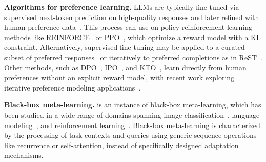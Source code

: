 \noindent \textbf{Algorithms for preference learning.}
LLMs are typically fine-tuned via supervised next-token prediction on high-quality responses and later refined with human preference data~\citep{casper2023open,ouyang2022training}. This process can use on-policy reinforcement learning methods like REINFORCE~\citep{NIPS1999_464d828b} or PPO~\citep{2017arXiv170706347S}, which optimize a reward model with a KL constraint. Alternatively, supervised fine-tuning may be applied to a curated subset of preferred responses~\citep{dubois2024alpacafarm} or iteratively to preferred completions as in ReST~\citep{gulcehre2023reinforced}. Other methods, such as DPO~\citep{rafailov2023direct}, IPO~\citep{2023arXiv231012036G}, and KTO~\citep{HALOs2024}, learn directly from human preferences without an explicit reward model, with recent work exploring iterative preference modeling applications~\citep{2024arXiv240110020Y}.

\noindent \textbf{Black-box meta-learning.}
\methodname{} is an instance of black-box meta-learning, which has been studied in a wide range of domains spanning image classification~\citep{santoro2016oneshotlearningmemoryaugmentedneural, mishra2018simpleneuralattentivemetalearner}, language modeling~\citep{chen2022metalearninglanguagemodelincontext, min2022metaicllearninglearncontext, yu2024metamathbootstrapmathematicalquestions}, and reinforcement learning~\citep{duan2016rl, wang2016learning}. Black-box meta-learning is characterized by the processing of task contexts and queries using generic sequence operations like recurrence or self-attention, instead of specifically designed adaptation mechanisms.



